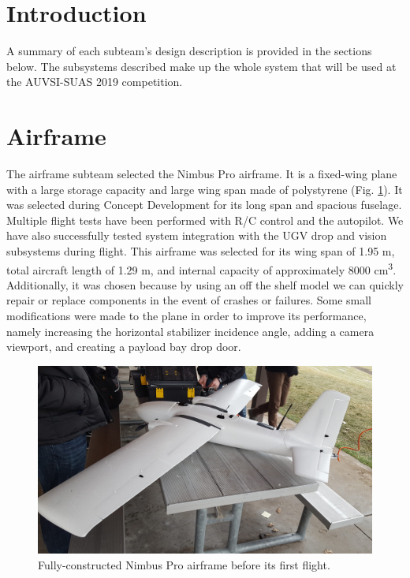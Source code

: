 \documentclass[]{auvsi_doc}
\begin{document}
\begin{AUVSITitlePage}
\begin{artifacttable}
\end{artifacttable}
\end{AUVSITitlePage}

\section{Introduction}
A summary of each subteam's design description is provided in the sections below. The subsystems described make up the whole system that will be used at the AUVSI-SUAS 2019 competition. 

\section{Airframe}

The airframe subteam selected the Nimbus Pro airframe.
It is a fixed-wing plane with a large storage capacity and large wing span made of polystyrene (Fig. \ref{fig:plane1}).
It was selected during Concept Development for its long span and spacious fuselage.
Multiple flight tests have been performed with R/C control and the autopilot.
We have also successfully tested system integration with the UGV drop and vision subsystems during flight.
This airframe was selected for its wing span of 1.95 m, total aircraft length of 1.29 m, and internal capacity of approximately 8000 cm\textsuperscript{3}. 
Additionally, it was chosen because by using an off the shelf model we can quickly repair or replace components in the event of crashes or failures.
Some small modifications were made to the plane in order to improve its performance, namely increasing the horizontal stabilizer incidence angle, adding a camera viewport, and creating a payload bay drop door.

\begin{figure}[h!]
	\centering
	\includegraphics[width=.9\columnwidth]{figs/plane1}
	\caption{Fully-constructed Nimbus Pro airframe before its first flight.}
	\label{fig:plane1}
\end{figure}
\end{document}
